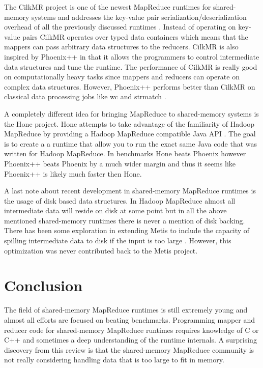 \documentclass[11pt]{article}       %
\begin{document}
The CilkMR project is one of the newest MapReduce runtimes for shared-memory
systems and addresses the key-value pair serialization/deserialization overhead
of all the previously discussed runtimes \cite{CilkMR}. Instead of operating on
key-value pairs CilkMR operates over typed data containers which means that the
mappers can pass arbitrary data structures to the reducers. CilkMR is also
inspired by Phoenix++ in that it allows the programmers to control intermediate
data structures and tune the runtime. The performance of CilkMR is really good
on computationally heavy tasks since mappers and reducers can operate on complex
data structures. However, Phoenix++ performs better than CilkMR on classical
data processing jobs like wc and strmatch \cite{CilkMR} \cite{GoogleMapReduce}.

A completely different idea for bringing MapReduce to shared-memory systems is
the Hone project. Hone attempts to take advantage of the familiarity of Hadoop
MapReduce by providing a Hadoop MapReduce compatible Java API
\cite{ScalingDown}. The goal is to create a a runtime that allow you to run the
exact same Java code that was written for Hadoop MapReduce. In benchmarks Hone
beats Phoenix however Phoenix++ beats Phoenix by a much wider margin and thus it
seems like Phoenix++ is likely much faster then Hone.

A last note about recent development in shared-memory MapReduce runtimes is the
usage of disk based data structures. In Hadoop MapReduce almost all intermediate
data will reside on disk at some point but in all the above mentioned
shared-memory runtimes there is never a mention of disk backing. There has been
some exploration in extending Metis to include the capacity of spilling
intermediate data to disk if the input is too large \cite{DiskOptimization}.
However, this optimization was never contributed back to the Metis project.

\section{Conclusion} \label{conclusion}

The field of shared-memory MapReduce runtimes is still extremely young and
almost all efforts are focused on beating benchmarks. Programming mapper and
reducer code for shared-memory MapReduce runtimes requires knowledge of C or C++
and sometimes a deep understanding of the runtime internals. A surprising
discovery from this review is that the shared-memory MapReduce community is not
really considering handling data that is too large to fit in memory.
\end{document}
